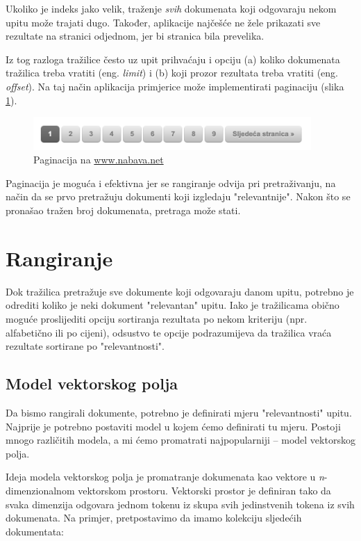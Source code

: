 \documentclass[a4paper,twoside,12pt]{memoir}
\begin{document}
Ukoliko je indeks jako velik, traženje \textit{svih} dokumenata koji odgovaraju nekom upitu može trajati dugo. Također, aplikacije najčešće ne žele prikazati sve rezultate na stranici odjednom, jer bi stranica bila prevelika.

Iz tog razloga tražilice često uz upit prihvaćaju i opciju (a) koliko dokumenata tražilica treba vratiti (eng. \textit{limit}) i (b) koji prozor rezultata treba vratiti (eng. \textit{offset}). Na taj način aplikacija primjerice može implementirati paginaciju (slika \ref{pagination}).

\begin{figure}[H]
  \centering
  \includegraphics[width=300pt]{pagination}
  \caption{Paginacija na \url{www.nabava.net}}
  \label{pagination}
\end{figure}

Paginacija je moguća i efektivna jer se rangiranje odvija pri pretraživanju, na način da se prvo pretražuju dokumenti koji izgledaju "relevantnije". Nakon što se pronašao tražen broj dokumenata, pretraga može stati.

\chapter{Rangiranje}

Dok tražilica pretražuje sve dokumente koji odgovaraju danom upitu, potrebno je odrediti koliko je neki dokument "relevantan" upitu. Iako je tražilicama obično moguće proslijediti opciju sortiranja rezultata po nekom kriteriju (npr. alfabetično ili po cijeni), odsustvo te opcije podrazumijeva da tražilica vraća rezultate sortirane po "relevantnosti".

\section{Model vektorskog polja}

Da bismo rangirali dokumente, potrebno je definirati mjeru "relevantnosti" upitu. Najprije je potrebno postaviti model u kojem ćemo definirati tu mjeru. Postoji mnogo različitih modela, a mi ćemo promatrati najpopularniji – model vektorskog polja.

Ideja modela vektorskog polja je promatranje dokumenata kao vektore u \textit{n}-dimenzionalnom vektorskom prostoru. Vektorski prostor je definiran tako da svaka dimenzija odgovara jednom tokenu iz skupa svih jedinstvenih tokena iz svih dokumenata. Na primjer, pretpostavimo da imamo kolekciju sljedećih dokumentata:
\end{document}
